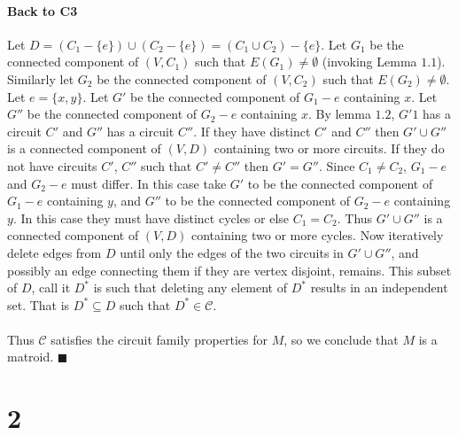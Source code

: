 \documentclass[letterpaper,12pt,oneside,onecolumn]{report}
\begin{document}
\paragraph{Back to C3}
Let $D = (C_1 - \{e\}) \cup (C_2 - \{e\}) = (C_1 \cup C_2) - \{e\}$. Let $G_1$ be the connected component of $(V,C_1)$ such that $E(G_1) \neq \emptyset$ (invoking Lemma $1.1$). Similarly let $G_2$ be the connected component of $(V,C_2)$ such that $E(G_2) \neq \emptyset$. Let $e = \{x,y\}$. Let $G'$ be the connected component of $G_1 - e$ containing $x$. Let $G''$ be the connected component of $G_2 - e$ containing $x$. By lemma $1.2$, $G'1$ has a circuit $C'$ and $G''$ has a circuit $C''$. If they have distinct $C'$ and $C''$ then $G' \cup G''$ is a connected component of $(V,D)$ containing two or more circuits. If they do not have circuits $C'$, $C''$ such that $C' \neq C''$ then $G' = G''$. Since $C_1 \neq C_2$, $G_1 - e$ and $G_2 - e$ must differ. In this case take $G'$ to be the connected component of $G_1 - e$ containing $y$, and $G''$ to be the connected component of $G_2 -e$ containing $y$. In this case they must have distinct cycles or else $C_1 = C_2$. Thus $G' \cup G''$ is a connected component of $(V,D)$ containing two or more cycles. Now iteratively delete edges from $D$ until only the edges of the two circuits in $G' \cup G''$, and possibly an edge connecting them if they are vertex disjoint, remains. This subset of $D$, call it $D^*$ is such that deleting any element of $D^*$ results in an independent set. That is $D^* \subseteq D$ such that $D^* \in \mathcal{C}$.
\paragraph{}
Thus $\mathcal{C}$ satisfies the circuit family properties for $M$, so we conclude that $M$ is a matroid. $\blacksquare$
\section*{2}
\end{document}

